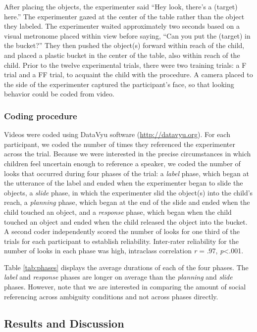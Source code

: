 \documentclass[a4paper,man,apacite,floatsintext]{apa6}
\begin{document}
After placing the objects, the experimenter said ``Hey look, there's a
(target) here.'' The experimenter gazed at the center of the table
rather than the object they labeled. The experimenter waited
approximately two seconds based on a visual metronome placed within view
before saying, ``Can you put the (target) in the bucket?'' They then
pushed the object(s) forward within reach of the child, and placed a
plastic bucket in the center of the table, also within reach of the
child. Prior to the twelve experimental trials, there were two training
trials: a F trial and a FF trial, to acquaint the child with the
procedure. A camera placed to the side of the experimenter captured the
participant's face, so that looking behavior could be coded from video.

\subsubsection{Coding procedure}\label{coding-procedure}

Videos were coded using DataVyu software (\url{http://datavyu.org}). For
each participant, we coded the number of times they referenced the
experimenter across the trial. Because we were interested in the precise
circumstances in which children feel uncertain enough to reference a
speaker, we coded the number of looks that occurred during four phases
of the trial: a \emph{label} phase, which began at the utterance of the
label and ended when the experimenter began to slide the objects, a
\emph{slide} phase, in which the experimenter slid the object(s) into
the child's reach, a \emph{planning} phase, which began at the end of
the slide and ended when the child touched an object, and a
\emph{response} phase, which began when the child touched an object and
ended when the child released the object into the bucket. A second coder
independently scored the number of looks for one third of the trials for
each participant to establish reliability. Inter-rater reliability for
the number of looks in each phase was high, intraclass correlation
\emph{r} = .97, \emph{p}\textless{}.001.

Table \ref{tab:phases} displays the average durations of each of the
four phases. The \emph{label} and \emph{response} phases are longer on
average than the \emph{planning} and \emph{slide} phases. However, note
that we are interested in comparing the amount of social referencing
across ambiguity conditions and not across phases directly.

\subsection{Results and Discussion}\label{results-and-discussion}
\end{document}
